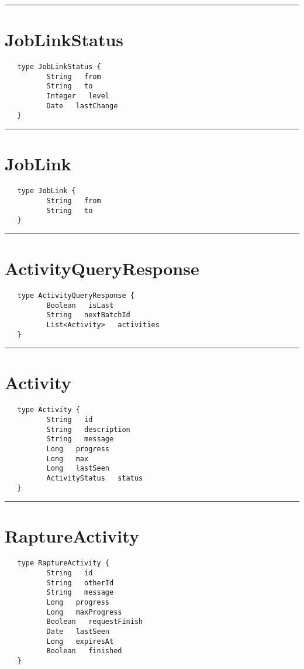 \rule{15cm}{2pt}
\section{JobLinkStatus}
\label{type:JobLinkStatus}

\begin{verbatim}
   type JobLinkStatus {
          String   from
          String   to
          Integer   level
          Date   lastChange
   }
\end{verbatim}

\rule{15cm}{2pt}
\section{JobLink}
\label{type:JobLink}

\begin{verbatim}
   type JobLink {
          String   from
          String   to
   }
\end{verbatim}

\rule{15cm}{2pt}
\section{ActivityQueryResponse}
\label{type:ActivityQueryResponse}

\begin{verbatim}
   type ActivityQueryResponse {
          Boolean   isLast
          String   nextBatchId
          List<Activity>   activities
   }
\end{verbatim}

\rule{15cm}{2pt}
\section{Activity}
\label{type:Activity}

\begin{verbatim}
   type Activity {
          String   id
          String   description
          String   message
          Long   progress
          Long   max
          Long   lastSeen
          ActivityStatus   status
   }
\end{verbatim}

\rule{15cm}{2pt}
\section{RaptureActivity}
\label{type:RaptureActivity}

\begin{verbatim}
   type RaptureActivity {
          String   id
          String   otherId
          String   message
          Long   progress
          Long   maxProgress
          Boolean   requestFinish
          Date   lastSeen
          Long   expiresAt
          Boolean   finished
   }
\end{verbatim}

